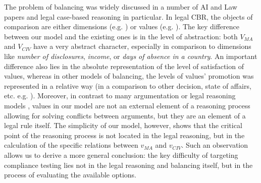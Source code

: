The problem of balancing was widely discussed in a number of AI and Law papers and legal case-based reasoning in particular. In legal CBR, the objects of comparison are either dimensions (e.g. \cite{benchcaponjurix2017}) or values (e.g. \cite{capon2013,grabmair2017}). The key difference between our model and the existing ones is in the level of abstraction: both $V_{MA}$ and $V_{CIV}$ have a very abstract character, especially in comparison to dimensions like \textit{number of disclosures}, \textit{income}, or \textit{days of absence in a country}. An important difference also lies in the absolute representation of the level of satisfaction of values, whereas in other models of balancing, the levels of values' promotion was represented in a relative way (in a comparison to other decision, state of affairs, etc. e.g. \cite{grabmair2017,maranhao2021}).  %
Moreover, in contrast to many argumentation or legal reasoning models \cite{bench-capon2003,zurek2013}, values in our model are not an external element of a reasoning process allowing for solving conflicts between arguments, but they are an element of a legal rule itself.
The simplicity of our model, however, shows that the critical point of the reasoning process is not located in the legal reasoning, but in the calculation of the specific relations between $v_{MA}$ and $v_{CIV}$. Such an observation allows us to derive a more general conclusion: the key difficulty of targeting compliance testing lies not in the legal reasoning and balancing itself, but in the process of evaluating the available options.


